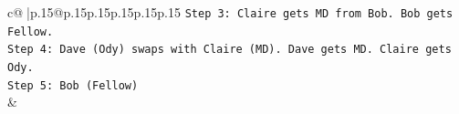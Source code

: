 \documentclass{article}
\begin{document}
{\begin{supertabular}{c@{$\;$}|p{.15\linewidth}@{}p{.15\linewidth}p{.15\linewidth}p{.15\linewidth}p{.15\linewidth}p{.15\linewidth}}
{{{\texttt{Step 3: Claire gets MD from Bob. Bob gets Fellow.} \\
\texttt{Step 4: Dave (Ody) swaps with Claire (MD). Dave gets MD. Claire gets Ody.} \\
\texttt{Step 5: Bob (Fellow)} \\
            }
        }
    }
    & \\ \\

\end{supertabular}
}
\end{document}
